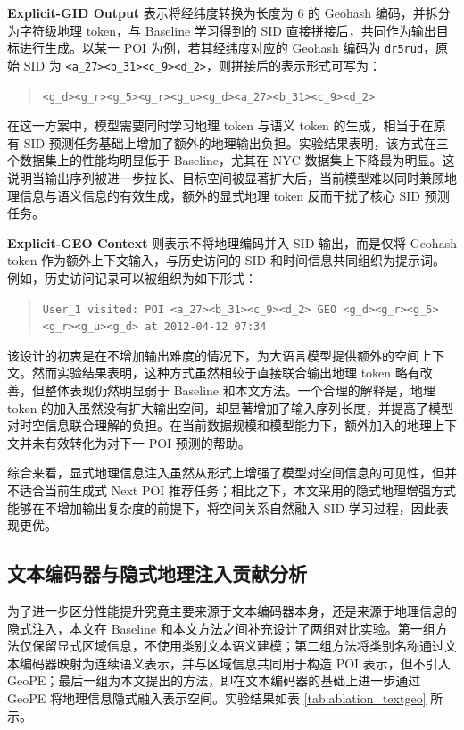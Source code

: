 \textbf{Explicit-GID Output} 表示将经纬度转换为长度为 6 的 Geohash 编码，并拆分为字符级地理 token，与 Baseline 学习得到的 SID 直接拼接后，共同作为输出目标进行生成。以某一 POI 为例，若其经纬度对应的 Geohash 编码为 \texttt{dr5rud}，原始 SID 为 \texttt{<a\_27><b\_31><c\_9><d\_2>}，则拼接后的表示形式可写为：
\begin{quote}
\small
\texttt{<g\_d><g\_r><g\_5><g\_r><g\_u><g\_d><a\_27><b\_31><c\_9><d\_2>}
\end{quote}
在这一方案中，模型需要同时学习地理 token 与语义 token 的生成，相当于在原有 SID 预测任务基础上增加了额外的地理输出负担。实验结果表明，该方式在三个数据集上的性能均明显低于 Baseline，尤其在 NYC 数据集上下降最为明显。这说明当输出序列被进一步拉长、目标空间被显著扩大后，当前模型难以同时兼顾地理信息与语义信息的有效生成，额外的显式地理 token 反而干扰了核心 SID 预测任务。

\textbf{Explicit-GEO Context} 则表示不将地理编码并入 SID 输出，而是仅将 Geohash token 作为额外上下文输入，与历史访问的 SID 和时间信息共同组织为提示词。例如，历史访问记录可以被组织为如下形式：
\begin{quote}
\small
\texttt{User\_1 visited: POI <a\_27><b\_31><c\_9><d\_2> GEO <g\_d><g\_r><g\_5><g\_r><g\_u><g\_d> at 2012-04-12 07:34}
\end{quote}
该设计的初衷是在不增加输出难度的情况下，为大语言模型提供额外的空间上下文。然而实验结果表明，这种方式虽然相较于直接联合输出地理 token 略有改善，但整体表现仍然明显弱于 Baseline 和本文方法。一个合理的解释是，地理 token 的加入虽然没有扩大输出空间，却显著增加了输入序列长度，并提高了模型对时空信息联合理解的负担。在当前数据规模和模型能力下，额外加入的地理上下文并未有效转化为对下一 POI 预测的帮助。

综合来看，显式地理信息注入虽然从形式上增强了模型对空间信息的可见性，但并不适合当前生成式 Next POI 推荐任务；相比之下，本文采用的隐式地理增强方式能够在不增加输出复杂度的前提下，将空间关系自然融入 SID 学习过程，因此表现更优。

\subsection{文本编码器与隐式地理注入贡献分析}
\label{sec:text_geo_ablation}

为了进一步区分性能提升究竟主要来源于文本编码器本身，还是来源于地理信息的隐式注入，本文在 Baseline 和本文方法之间补充设计了两组对比实验。第一组方法仅保留显式区域信息，不使用类别文本语义建模；第二组方法将类别名称通过文本编码器映射为连续语义表示，并与区域信息共同用于构造 POI 表示，但不引入 GeoPE；最后一组为本文提出的方法，即在文本编码器的基础上进一步通过 GeoPE 将地理信息隐式融入表示空间。实验结果如表 \ref{tab:ablation_textgeo} 所示。

